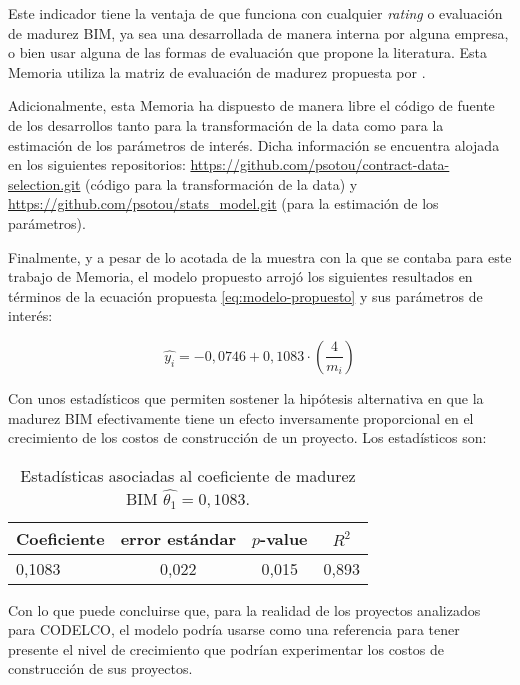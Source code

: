 Este indicador tiene la ventaja de que funciona con cualquier \emph{rating} o evaluación de madurez BIM, ya sea una desarrollada de manera interna por alguna empresa, o bien usar alguna de las formas de evaluación que propone la literatura. Esta Memoria utiliza la matriz de evaluación de madurez propuesta por .

Adicionalmente, esta Memoria ha dispuesto de manera libre el código de fuente de los desarrollos tanto para la transformación de la data como para la estimación de los parámetros de interés. Dicha información se encuentra alojada en los siguientes repositorios: \url{https://github.com/psotou/contract-data-selection.git} (código para la transformación de la data) y \url{https://github.com/psotou/stats_model.git} (para la estimación de los parámetros).

Finalmente, y a pesar de lo acotada de la muestra con la que se contaba para este trabajo de Memoria, el modelo propuesto arrojó los siguientes resultados en términos de la ecuación propuesta \eqref{eq:modelo-propuesto} y sus parámetros de interés:

\begin{equation*}
    \hat{y_i} = -0,0746 + 0,1083\cdot \left( \frac{4}{m_i} \right)
\end{equation*}

Con unos estadísticos que permiten sostener la hipótesis alternativa en que la madurez BIM efectivamente tiene un efecto inversamente proporcional en el crecimiento de los costos de construcción de un proyecto. Los estadísticos son:

\begin{table}[H]
    \centering
    \caption{Estadísticas asociadas al coeficiente de madurez BIM $\hat{\theta_1} = 0,1083$.}
    \begin{tabular}{lccc}
        \toprule
        Coeficiente & error estándar & $p$-value & $R^2$\\
        \midrule
        0,1083      & 0,022          & 0,015     & 0,893\\  
        \bottomrule        
    \end{tabular}
\end{table}

Con lo que puede concluirse que, para la realidad de los proyectos analizados para CODELCO, el modelo podría usarse como una referencia para tener presente el nivel de crecimiento que podrían experimentar los costos de construcción de sus proyectos.